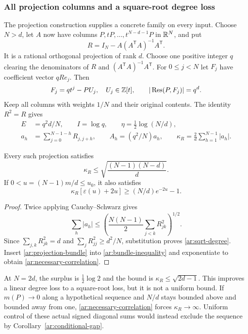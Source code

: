\subsubsection{All projection columns and a square-root degree loss}
\label{ar:all-columns}

The projection construction supplies a concrete family on every input.
Choose $N>d$, let $A$ now have columns $P,tP,\ldots,t^{N-d-1}P$ in $\mathbb R^N$, and put
\[
 R=I_N-A(A^{\mathsf T}A)^{-1}A^{\mathsf T}.
\]
It is a rational orthogonal projection of rank $d$.
Choose one positive integer $q$ clearing the denominators of $R$ and $(A^{\mathsf T}A)^{-1}A^{\mathsf T}$.
For $0\le j<N$ let $F_j$ have coefficient vector $qRe_j$.
Then
\[
 F_j=qt^j-PU_j,\quad U_j\in\mathbb Z[t],\qquad
 |\operatorname{Res}(P,F_j)|=q^d.
\]
Keep all columns with weights $1/N$ and their original contents.
The identity $R^2=R$ gives
\begin{equation}
 \begin{split}
 E&=q^2d/N,\qquad I=\log q,\qquad
 \eta=\tfrac12\log(N/d),\\
 a_h&=\sum_{j=0}^{N-1-h}R_{j,j+h},\qquad
 A_h=(q^2/N)a_h,\qquad
 \kappa_R=\frac2d\sum_{h=1}^{N-1}|a_h|.
 \end{split}
 \label{ar:projection-bundle}
\end{equation}

\begin{proposition}\label{ar:sqrt-bound}
Every such projection satisfies
\begin{equation}
 \kappa_R\le\sqrt{\frac{(N-1)(N-d)}d}.
 \label{ar:sqrt-degree}
\end{equation}
If $0<u=(N-1)m/d\le u_0$, it also satisfies
\begin{equation}
 \kappa_R[\varepsilon(u)+2u]\ge (N/d)e^{-2u}-1.
 \label{ar:necessary-correlation}
\end{equation}
\end{proposition}

\begin{proof}
Twice applying Cauchy--Schwarz gives
\[
 \sum_h|a_h|
 \le\left(\frac{N(N-1)}2\sum_{j<k}R_{jk}^2\right)^{1/2}.
\]
Since $\sum_{j,k}R_{jk}^2=d$ and $\sum_jR_{jj}^2\ge d^2/N$, substitution proves \eqref{ar:sqrt-degree}.
Insert \eqref{ar:projection-bundle} into \eqref{ar:bundle-inequality} and exponentiate to obtain \eqref{ar:necessary-correlation}.
\end{proof}

At $N=2d$, the surplus is $\frac12\log2$ and the bound is $\kappa_R\le\sqrt{2d-1}$.
This improves a linear degree loss to a square-root loss, but it is not a uniform bound.
If $m(P)\to0$ along a hypothetical sequence and $N/d$ stays bounded above and bounded away from one, \eqref{ar:necessary-correlation} forces $\kappa_R\to\infty$.
Uniform control of these actual signed diagonal sums would instead exclude the sequence by Corollary~\ref{ar:conditional-gap}.

